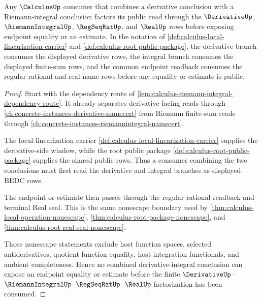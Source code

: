 \begin{theorem}
\label{thm:calculus-riemann-integral-dependency-factorization}
Any $\CalculusUp$ consumer that combines a derivative conclusion with a Riemann-integral conclusion factors its public read through the $\DerivativeUp$, $\RiemannIntegralUp$, $\RegSeqRatUp$, and $\RealUp$ rows before exposing endpoint equality or an estimate. In the notation of \autoref{def:calculus-local-linearization-carrier} and \autoref{def:calculus-root-public-package}, the derivative branch consumes the displayed derivative rows, the integral branch consumes the displayed finite-sum rows, and the common endpoint readback consumes the regular rational and real-name rows before any equality or estimate is public.
\end{theorem}
\begin{proof}
Start with the dependency route of \autoref{lem:calculus-riemann-integral-dependency-route}. It already separates derivative-facing reads through \autoref{ch:concrete-instances-derivative-namecert} from Riemann finite-sum reads through \autoref{ch:concrete-instances-riemannintegral-namecert}.

The local-linearization carrier \autoref{def:calculus-local-linearization-carrier} supplies the derivative-side window, while the root public package \autoref{def:calculus-root-public-package} supplies the shared public rows. Thus a consumer combining the two conclusions must first read the derivative and integral branches as displayed BEDC rows.

The endpoint or estimate then passes through the regular rational readback and terminal Real seal. This is the same nonescape boundary used by \autoref{thm:calculus-local-operation-nonescape}, \autoref{thm:calculus-root-package-nonescape}, and \autoref{thm:calculus-root-real-seal-nonescape}.

Those nonescape statements exclude host function spaces, selected antiderivatives, quotient function equality, host integration functionals, and ambient completeness. Hence no combined derivative-integral conclusion can expose an endpoint equality or estimate before the finite $\DerivativeUp$--$\RiemannIntegralUp$--$\RegSeqRatUp$--$\RealUp$ factorization has been consumed.
\end{proof}

